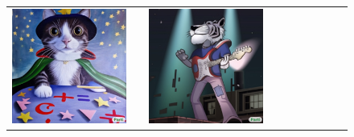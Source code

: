 \begin{figure}[ht!]
\begin{adjustwidth}{-0.8in}{-0.5in}  
    \centering                     
    \footnotesize
\setlength\tabcolsep{1pt}
\vspace{-0.2in}
\begin{tabular}{cccccccccccccccccccc}
\multicolumn{6}{c}{\includegraphics[width=\thirdcolwidth\textwidth]{figures/cherries/wizard_cat.jpg}} &&
\multicolumn{6}{c}{\includegraphics[width=\thirdcolwidth\textwidth]{figures/cherries/heavy_metal_tiger.jpg}} &&

\end{tabular}
\end{adjustwidth}
\end{figure}
